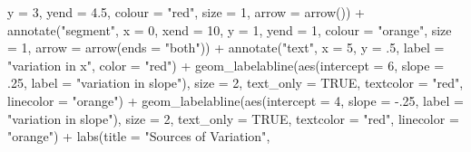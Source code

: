 \documentclass[
  letterpaper,
  DIV=11,
  numbers=noendperiod]{scrreprt}
\newenvironment{Shaded}{\begin{snugshade}}{\end{snugshade}}
\newcommand{\AttributeTok}[1]{\textcolor[rgb]{0.40,0.45,0.13}{#1}}
\newcommand{\ConstantTok}[1]{\textcolor[rgb]{0.56,0.35,0.01}{#1}}
\newcommand{\DecValTok}[1]{\textcolor[rgb]{0.68,0.00,0.00}{#1}}
\newcommand{\FloatTok}[1]{\textcolor[rgb]{0.68,0.00,0.00}{#1}}
\newcommand{\FunctionTok}[1]{\textcolor[rgb]{0.28,0.35,0.67}{#1}}
\newcommand{\NormalTok}[1]{\textcolor[rgb]{0.00,0.23,0.31}{#1}}
\newcommand{\SpecialCharTok}[1]{\textcolor[rgb]{0.37,0.37,0.37}{#1}}
\newcommand{\StringTok}[1]{\textcolor[rgb]{0.13,0.47,0.30}{#1}}
\begin{document}
\begin{Shaded}
\begin{Highlighting}[]
           \AttributeTok{y =} \DecValTok{3}\NormalTok{, }
           \AttributeTok{yend =} \FloatTok{4.5}\NormalTok{,}
           \AttributeTok{colour =} \StringTok{"red"}\NormalTok{, }
           \AttributeTok{size =} \DecValTok{1}\NormalTok{, }
           \AttributeTok{arrow =} \FunctionTok{arrow}\NormalTok{()) }\SpecialCharTok{+}
  \FunctionTok{annotate}\NormalTok{(}\StringTok{"segment"}\NormalTok{, }
           \AttributeTok{x =} \DecValTok{0}\NormalTok{, }
           \AttributeTok{xend =} \DecValTok{10}\NormalTok{, }
           \AttributeTok{y =} \DecValTok{1}\NormalTok{, }
           \AttributeTok{yend =} \DecValTok{1}\NormalTok{,}
           \AttributeTok{colour =} \StringTok{"orange"}\NormalTok{, }
           \AttributeTok{size =} \DecValTok{1}\NormalTok{, }
           \AttributeTok{arrow =} \FunctionTok{arrow}\NormalTok{(}\AttributeTok{ends =} \StringTok{"both"}\NormalTok{)) }\SpecialCharTok{+}
  \FunctionTok{annotate}\NormalTok{(}\StringTok{"text"}\NormalTok{,}
           \AttributeTok{x =} \DecValTok{5}\NormalTok{,}
           \AttributeTok{y =}\NormalTok{ .}\DecValTok{5}\NormalTok{,}
           \AttributeTok{label =} \StringTok{"variation in x"}\NormalTok{,}
           \AttributeTok{color =} \StringTok{"red"}\NormalTok{) }\SpecialCharTok{+}
  \FunctionTok{geom\_labelabline}\NormalTok{(}\FunctionTok{aes}\NormalTok{(}\AttributeTok{intercept =} \DecValTok{6}\NormalTok{, }
                       \AttributeTok{slope =}\NormalTok{ .}\DecValTok{25}\NormalTok{, }
                       \AttributeTok{label =} \StringTok{"variation in slope"}\NormalTok{),}
                   \AttributeTok{size =} \DecValTok{2}\NormalTok{,}
                   \AttributeTok{text\_only =} \ConstantTok{TRUE}\NormalTok{,}
                   \AttributeTok{textcolor =} \StringTok{"red"}\NormalTok{,}
                   \AttributeTok{linecolor =} \StringTok{"orange"}\NormalTok{) }\SpecialCharTok{+}
  \FunctionTok{geom\_labelabline}\NormalTok{(}\FunctionTok{aes}\NormalTok{(}\AttributeTok{intercept =} \DecValTok{4}\NormalTok{, }
                       \AttributeTok{slope =} \SpecialCharTok{{-}}\NormalTok{.}\DecValTok{25}\NormalTok{, }
                       \AttributeTok{label =} \StringTok{"variation in slope"}\NormalTok{),}
                   \AttributeTok{size =} \DecValTok{2}\NormalTok{,}
                   \AttributeTok{text\_only =} \ConstantTok{TRUE}\NormalTok{,}
                   \AttributeTok{textcolor =} \StringTok{"red"}\NormalTok{,}
                   \AttributeTok{linecolor =} \StringTok{"orange"}\NormalTok{) }\SpecialCharTok{+}
  \FunctionTok{labs}\NormalTok{(}\AttributeTok{title =} \StringTok{"Sources of Variation"}\NormalTok{,}

\end{Highlighting}
\end{Shaded}
\end{document}
